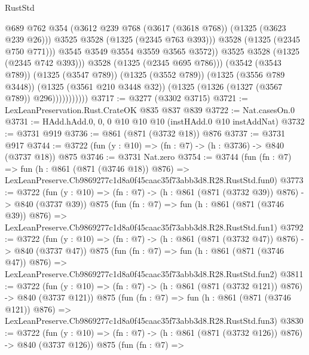 \begin{lexlean}{RustStd}
\begin{coremodule}
                                  @689
                                  @762
                                  @354
                                  (@3612 @239 @768 (@3617 (@3618 @768)) (@1325 (@3623 @239 @26)))
                                  @3525
                                  @3528
                                  (@1325 (@2345 @763 @393)))
                                @3528
                                (@1325 (@2345 @750 @771)))
                              @3545
                              @3549
                              @3554
                              @3559
                              @3565
                              @3572))
                          @3525
                          @3528
                          (@1325 (@2345 @742 @393)))
                        @3528
                        (@1325 (@2345 @695 @786)))
                      (@3542 (@3543 @789))
                      (@1325 (@3547 @789))
                      (@1325 (@3552 @789))
                      (@1325 (@3556 @789 @3448))
                      (@1325 (@3561 @210 @3448 @32))
                      (@1325 (@1326 (@1327 (@3567 @789)) @296)))))))))))
@3717 := @3277 (@3302 @3715)
@3721 := LexLeanPreservation.Rust.CrateOK @835 @837 @839
@3722 := Nat.casesOn.{0}
@3731 := HAdd.hAdd.{0, 0, 0} @10 @10 @10 (instHAdd.{0} @10 instAddNat)
@3732 := @3731 @919
@3736 := @861 (@871 (@3732 @18)) @876
@3737 := @3731 @917
@3744 := @3722 (fun (y : @10) => (fn : @7) -> (h : @3736) -> @840 (@3737 @18)) @875
@3746 := @3731 Nat.zero
@3754 := @3744
    (fun (fn : @7) =>
    fun (h : @861 (@871 (@3746 @18)) @876) =>
    LexLeanPreserve.Cb9869277c1d8a0f45caac35f73abb3d8.R28.RustStd.fun0)
@3773 := @3722
    (fun (y : @10) => (fn : @7) -> (h : @861 (@871 (@3732 @39)) @876) -> @840 (@3737 @39))
    @875
    (fun (fn : @7) =>
    fun (h : @861 (@871 (@3746 @39)) @876) =>
    LexLeanPreserve.Cb9869277c1d8a0f45caac35f73abb3d8.R28.RustStd.fun1)
@3792 := @3722
    (fun (y : @10) => (fn : @7) -> (h : @861 (@871 (@3732 @47)) @876) -> @840 (@3737 @47))
    @875
    (fun (fn : @7) =>
    fun (h : @861 (@871 (@3746 @47)) @876) =>
    LexLeanPreserve.Cb9869277c1d8a0f45caac35f73abb3d8.R28.RustStd.fun2)
@3811 := @3722
    (fun (y : @10) => (fn : @7) -> (h : @861 (@871 (@3732 @121)) @876) -> @840 (@3737 @121))
    @875
    (fun (fn : @7) =>
    fun (h : @861 (@871 (@3746 @121)) @876) =>
    LexLeanPreserve.Cb9869277c1d8a0f45caac35f73abb3d8.R28.RustStd.fun3)
@3830 := @3722
    (fun (y : @10) => (fn : @7) -> (h : @861 (@871 (@3732 @126)) @876) -> @840 (@3737 @126))
    @875
    (fun (fn : @7) =>

\end{coremodule}
\end{lexlean}
